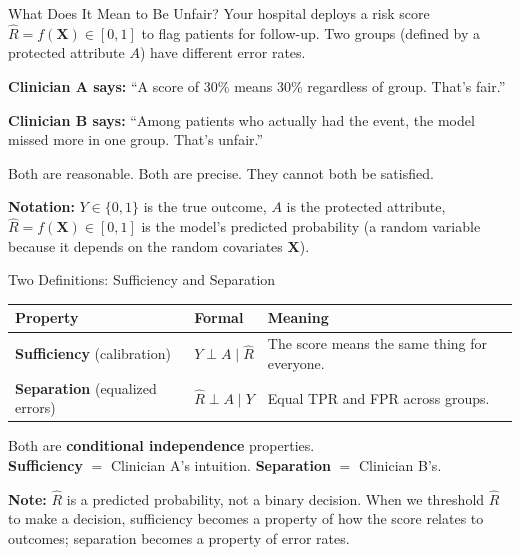 \documentclass[aspectratio=169,10pt]{beamer}
\begin{document}
\begin{frame}{What Does It Mean to Be Unfair?}
Your hospital deploys a risk score $\hat{R} = f(\mathbf{X}) \in [0,1]$ to flag patients for follow-up. Two groups (defined by a protected attribute $A$) have different error rates.

\vspace{0.5em}
\textbf{Clinician A says:} ``A score of 30\% means 30\% regardless of group. That's fair.''

\vspace{0.3em}
\textbf{Clinician B says:} ``Among patients who actually had the event, the model missed more in one group. That's unfair.''

\vspace{0.5em}
\pause
Both are reasonable. Both are precise. \alert{They cannot both be satisfied.}

\vspace{0.3em}
{\small \textbf{Notation:} $Y \in \{0,1\}$ is the true outcome, $A$ is the protected attribute, $\hat{R} = f(\mathbf{X}) \in [0,1]$ is the model's predicted probability (a random variable because it depends on the random covariates $\mathbf{X}$).}
\end{frame}

\begin{frame}{Two Definitions: Sufficiency and Separation}

\vspace{0.3em}
\begin{center}
\renewcommand{\arraystretch}{1.4}
{\small
\begin{tabular}{lll}
\toprule
\textbf{Property} & \textbf{Formal} & \textbf{Meaning} \\
\midrule
\textbf{Sufficiency} {\scriptsize (calibration)} & $Y \perp A \mid \hat{R}$ & The score means the same thing for everyone. \\
\textbf{Separation} {\scriptsize (equalized errors)} & $\hat{R} \perp A \mid Y$ & Equal TPR and FPR across groups. \\
\bottomrule
\end{tabular}
}
\end{center}

\vspace{0.3em}
\pause
Both are \textbf{conditional independence} properties.\\
\textbf{Sufficiency} $=$ Clinician A's intuition. \textbf{Separation} $=$ Clinician B's.

\vspace{0.3em}
{\small \textbf{Note:} $\hat{R}$ is a predicted probability, not a binary decision. When we threshold $\hat{R}$ to make a decision, sufficiency becomes a property of how the score relates to outcomes; separation becomes a property of error rates.}
\end{frame}
\end{document}
